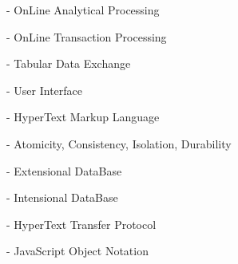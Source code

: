 \label{sec:terms}

\olap\xspace - OnLine Analytical Processing

\oltp\xspace - OnLine Transaction Processing

\tdx\xspace - Tabular Data Exchange

\ui\xspace - User Interface

\html\xspace - HyperText Markup Language

\acid\xspace - Atomicity, Consistency, Isolation, Durability

\edb\xspace - Extensional DataBase

\idb\xspace - Intensional DataBase

\http\xspace - HyperText Transfer Protocol

\json\xspace - JavaScript Object Notation
